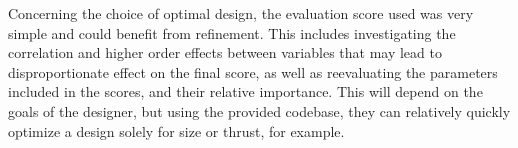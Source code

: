 \documentclass{homework}
\begin{document}
\begin{multicols}{2}
Concerning the choice of optimal design, the evaluation score used was very simple and could benefit from refinement. This includes investigating the correlation and higher order effects between variables that may lead to disproportionate effect on the final score, as well as reevaluating the parameters included in the scores, and their relative importance. This will depend on the goals of the designer, but using the provided codebase, they can relatively quickly optimize a design solely for size or thrust, for example.


\end{multicols}
\end{document}
